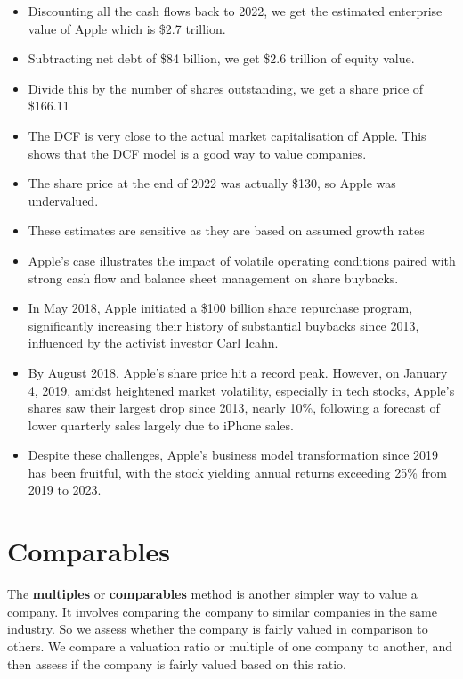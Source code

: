 \begin{itemize}
    \item Discounting all the cash flows back to 2022, we get the estimated enterprise value of Apple which is \$2.7 trillion. 
    \item Subtracting net debt of \$84 billion, we get \$2.6 trillion of equity value. 
    \item Divide this by the number of shares outstanding, we get a share price of \$166.11
    \item The DCF is very close to the actual market capitalisation of Apple. This shows that the DCF model is a good way to value companies.
    \item The share price at the end of 2022 was actually \$130, so Apple was undervalued.
    \item These estimates are sensitive as they are based on assumed growth rates
    \item Apple's case illustrates the impact of volatile operating conditions paired with strong cash flow and balance sheet management on share buybacks.
    \item In May 2018, Apple initiated a \$100 billion share repurchase program, significantly increasing their history of substantial buybacks since 2013, influenced by the activist investor Carl Icahn.
    \item By August 2018, Apple's share price hit a record peak. However, on January 4, 2019, amidst heightened market volatility, especially in tech stocks, Apple's shares saw their largest drop since 2013, nearly 10\%, following a forecast of lower quarterly sales largely due to iPhone sales.
    \item Despite these challenges, Apple's business model transformation since 2019 has been fruitful, with the stock yielding annual returns exceeding 25\% from 2019 to 2023.
  \end{itemize}




\section{Comparables}

The \textbf{multiples} or \textbf{comparables} method is another simpler way to value a company. It involves comparing the company to similar companies in the same industry. So we assess whether the company is fairly valued in comparison to others. We compare a valuation ratio or multiple of one company to another, and then assess if the company is fairly valued based on this ratio.\\

